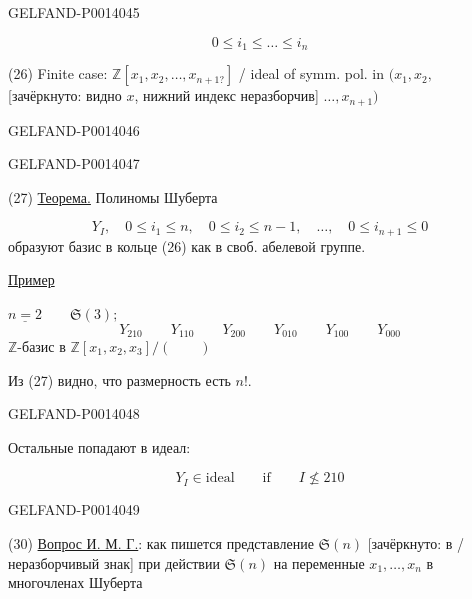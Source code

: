 \begin{GelfandAdjacentEvidence}{GELFAND-P001404}{5}

\[
0\le i_1\le\dots\le i_n
\]

(26) Finite case:
\(\mathbb{Z}[x_1,x_2,\dots,x_{n+1?}]\) / ideal of symm. pol. in
\((x_1,x_2,\)
[зачёркнуто: видно \(x\), нижний индекс неразборчив]
\(\dots,x_{n+1})\)

\end{GelfandAdjacentEvidence}
\begin{GelfandAdjacentEvidence}{GELFAND-P001404}{6}



\end{GelfandAdjacentEvidence}
\begin{GelfandAdjacentEvidence}{GELFAND-P001404}{7}


(27) \uline{Теорема.} Полиномы Шуберта

\begin{equation*}
Y_I,\quad 0\le i_1\le n,\quad 0\le i_2\le n-1,\quad\dots,\quad
0\le i_{n+1}\le 0 \tag{28}
\end{equation*}
образуют базис в кольце (26) как в своб. абелевой группе.

\uline{Пример}

\(\underline{n=2}\qquad\mathfrak{S}(3);\)
\[
Y_{210}\qquad Y_{110}\qquad Y_{200}\qquad
Y_{010}\qquad Y_{100}\qquad Y_{000}
\]
\(\mathbb{Z}\)-базис в \(\mathbb{Z}[x_1,x_2,x_3]/(\qquad)\)

Из (27) видно, что размерность есть \(n!\).
\end{GelfandAdjacentEvidence}
\begin{GelfandAdjacentEvidence}{GELFAND-P001404}{8}


Остальные попадают в идеал:

\begin{equation*}
Y_I\in\mathrm{ideal}\qquad\text{if}\qquad I\nleq 210 \tag{29}
\end{equation*}
\end{GelfandAdjacentEvidence}
\begin{GelfandAdjacentEvidence}{GELFAND-P001404}{9}


(30) \uline{Вопрос И. М. Г.}: как пишется представление \(\mathfrak{S}(n)\)
[зачёркнуто: в / неразборчивый знак]
при действии \(\mathfrak{S}(n)\) на переменные \(x_1,\dots,x_n\) в многочленах Шуберта

\end{GelfandAdjacentEvidence}
